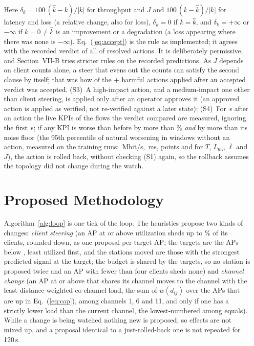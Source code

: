\documentclass[conference]{IEEEtran}
\begin{document}
Here $\delta_k=100\,(\hat k-k)/|k|$ for throughput and $J$ and $100\,(k-\hat k)/|k|$ for latency and loss (a relative change, also for loss), $\delta_k=0$ if $k=\hat k$, and $\delta_k=+\infty$ or $-\infty$ if $k=0\neq\hat k$ is an improvement or a degradation (a loss appearing where there was none is $-\infty$). Eq.~(\ref{eq:accept}) is the rule as implemented; it agrees with the recorded verdict of all \RuleAgree{} of \RuleTotal{} resolved actions. It is deliberately permissive, and Section~VII-B tries stricter rules on the recorded predictions. As $J$ depends on client counts alone, a steer that evens out the counts can satisfy the second clause by itself; that was how \HarmJainOnly{} of the \the\numexpr\HarmAccepted+\HarmVthree\relax{} harmful actions applied after an accepted verdict was accepted.
(S3)~A high-impact action, and a medium-impact one other than client steering, is applied only after an operator approves it (an approved action is applied as verified, not re-verified against a later state);
(S4)~For \CfgWatch\,s after an action the live KPIs of the flows the verdict compared are measured, ignoring the first \CfgSettle\,s; if any KPI is worse than before by more than \CfgRegressPct\% \emph{and} by more than its noise floor (the 95th percentile of natural worsening in windows without an action, measured on the training runs: \CfgFloorThr\,Mbit/s, \CfgFloorLat\,ms, \CfgFloorLoss{} points and \CfgFloorJain{} for $T$, $L_{95}$, $\bar\ell$ and $J$), the action is rolled back, without checking (S1) again, so the rollback assumes the topology did not change during the watch.

\section{Proposed Methodology}
Algorithm~\ref{alg:loop} is one tick of the loop. The heuristics propose two kinds of changes: \emph{client steering} (an AP at or above utilization \CfgUtilHigh{} sheds up to \CfgMaxSteerPct\% of its clients, rounded down, as one proposal per target AP; the targets are the APs below \CfgUtilTarget{}, least utilized first, and the stations moved are those with the strongest predicted signal at the target; the budget is shared by the targets, so no station is proposed twice and an AP with fewer than four clients sheds none) and \emph{channel change} (an AP at or above \CfgUtilHigh{} that shares its channel moves to the channel with the least distance-weighted co-channel load, the sum of $w(d_{ij})$ over the APs that are up in Eq.~(\ref{eq:cap}), among channels 1, 6 and 11, and only if one has a strictly lower load than the current channel, the lowest-numbered among equals). While a change is being watched nothing new is proposed, so effects are not mixed up, and a proposal identical to a just-rolled-back one is not repeated for 120\,s.
\end{document}
